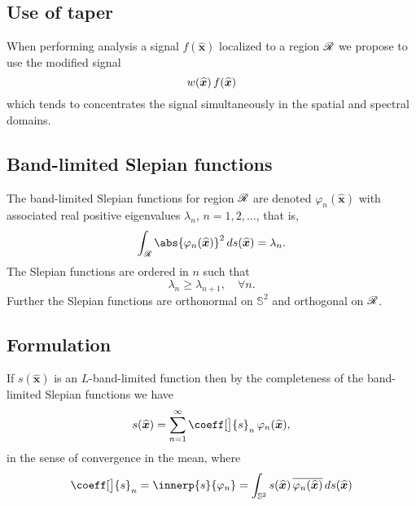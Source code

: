 \documentclass[10pt, twocolumn, twoside]{IEEEtran}
\newcommand{\untsph}{\mathbb{S}^{2}} %
\newcommand{\unit}[1]{\widehat{\bm{#1}}}
\newcommand{\conj}[1]{\overline{#1}} %
\begin{document}
\subsection{Use of taper}

When performing analysis a signal $f(\unit{x})$ localized to a region $\mathscr{R}$ we propose to use the modified signal
\[
\taper(\unit{x})\,f(\unit{x})
\]
which tends to concentrates the signal simultaneously in the spatial and spectral domains.

\subsection{Band-limited Slepian functions}

The band-limited Slepian functions for region $\mathscr{R}$ are denoted
$\varphi_n(\unit{x})$
with associated real positive eigenvalues $\lambda_n$, $n=1,2,\dotsc$, that is,
\[
\int_{\R} \abs{\varphi_n(\unit{x})}^2\,ds(\unit{x}) = \lambda_n.
\]
The Slepian functions are ordered in $n$ such that
\[
\lambda_n\geq\lambda_{n+1},\quad \forall n.
\]
Further the Slepian functions are orthonormal on $\untsph$ and orthogonal on $\mathscr{R}$.


\newcommand{\band}{s}
\newcommand{\bandt}{\band^{\lambda}}

\subsection{Formulation}

If $\band(\unit{x})$ is an $L$-band-limited function then by the completeness of the band-limited Slepian functions we have
\begin{equation}
\label{eqn:expan}
\band(\unit{x}) =
\sum_{n=1}^\infty \coeff[\big]{\band}_n\,\varphi_n(\unit{x}),
\end{equation}
in the sense of convergence in the mean, where
\begin{equation}
\label{eqn:coeff}
\coeff[\big]{\band}_n =
\innerp{\band}{\varphi_n} =
\int_{\untsph} \band(\unit{x})\,\conj{\varphi_n(\unit{x})}\,ds(\unit{x})
\end{equation}
\end{document}
